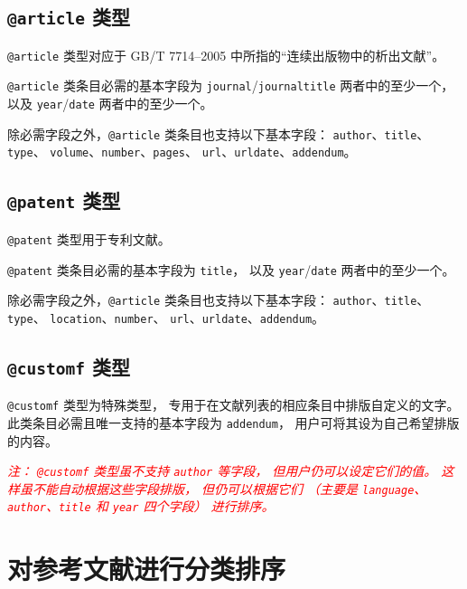 \documentclass[UTF8]{ctexart}
\newcommand{\myemph}[1]{\emph{\textcolor{red}{#1}}}
\begin{document}
\subsection{\texttt{@article} 类型}

\verb|@article| 类型对应于 GB/T 7714--2005 中所指的“连续出版物中的析出文献”。

\verb|@article| 类条目必需的基本字段为
\verb|journal|/\verb|journaltitle| 两者中的至少一个，
以及 \verb|year|/\verb|date| 两者中的至少一个。

除必需字段之外，\verb|@article| 类条目也支持以下基本字段：%
\verb|author|、\verb|title|、\verb|type|、%
\verb|volume|、\verb|number|、\verb|pages|、%
\verb|url|、\verb|urldate|、\verb|addendum|。

\subsection{\texttt{@patent} 类型}

\verb|@patent| 类型用于专利文献。

\verb|@patent| 类条目必需的基本字段为 \verb|title|，
以及 \verb|year|/\verb|date| 两者中的至少一个。

除必需字段之外，\verb|@article| 类条目也支持以下基本字段：%
\verb|author|、\verb|title|、\verb|type|、%
\verb|location|、\verb|number|、%
\verb|url|、\verb|urldate|、\verb|addendum|。

\subsection{\texttt{@customf} 类型}

\verb|@customf| 类型为特殊类型，
专用于在文献列表的相应条目中排版自定义的文字。
此类条目必需且唯一支持的基本字段为 \verb|addendum|，
用户可将其设为自己希望排版的内容。

\myemph{%
	注：%
	\texttt{@customf} 类型虽不支持 \texttt{author} 等字段，
	但用户仍可以设定它们的值。
	这样虽不能自动根据这些字段排版，
	但仍可以根据它们
	（主要是 \texttt{language}、\texttt{author}、\texttt{title}
	和 \texttt{year} 四个字段）
	进行排序。 %
}

\section{对参考文献进行分类排序}\label{sec:catsort}
\end{document}
